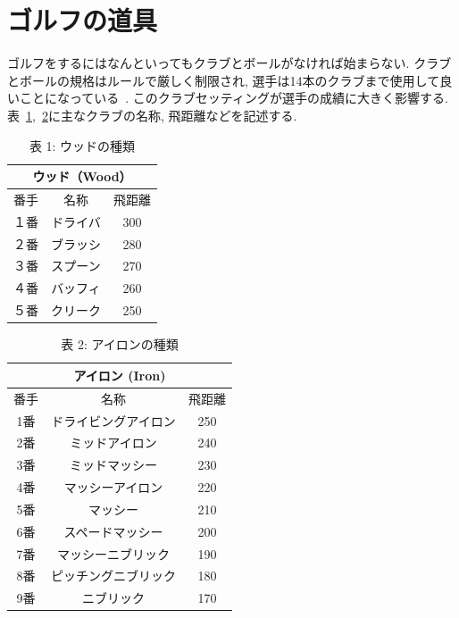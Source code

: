 \documentclass[a4j, twocolumn]{jarticle}
\begin{document}
\section{ゴルフの道具}
ゴルフをするにはなんといってもクラブとボールがなければ始まらない. クラブとボールの規格はルールで厳しく制限され, 選手は14本のクラブまで使用して良いことになっている~\cite{GOLFRULE}. このクラブセッティングが選手の成績に大きく影響する. 表~\ref{wood-data},~\ref{iron-data}に主なクラブの名称, 飛距離などを記述する.
\begin{table}[htb]
  \caption{表 1: ウッドの種類}\label{wood-data}
  \begin{center}
    \begin{tabular}{|c|c|c|}
      \hline
      \multicolumn{3}{|c|}{ウッド（Wood）} \\
      \hline
      \hline
      番手 & 名称 & 飛距離 \\
      \hline
      １番 & ドライバ & 300 \\
      \hline
      ２番 & ブラッシ & 280 \\
      \hline
      ３番 & スプーン & 270 \\
      \hline
      ４番 & バッフィ & 260\\
      \hline 
      ５番 & クリーク & 250 \\
      \hline
      
    \end{tabular}
  \end{center}
\end{table}
\vspace{-3em}
\begin{table}[htb]
  \caption{表 2: アイロンの種類}\label{iron-data}
  \begin{center}
    \begin{tabular}{|c|c|c|}
      \hline
      \multicolumn{3}{|c|}{アイロン (Iron)} \\
      \hline
      \hline
      番手 & 名称 & 飛距離 \\
      \hline
      1番 & ドライビングアイロン & 250 \\
      \hline
      2番 & ミッドアイロン & 240 \\
      \hline
      3番 & ミッドマッシー & 230 \\
      \hline
      4番 & マッシーアイロン & 220\\
      \hline 
      5番 & マッシー & 210 \\
      \hline
      6番 & スペードマッシー & 200 \\
      \hline
      7番 & マッシーニブリック & 190\\
      \hline 
      8番 & ピッチングニブリック & 180 \\
      \hline
      9番 & ニブリック & 170 \\
      \hline
    \end{tabular}
  \end{center}
\end{table}
\vspace{-2em}
\end{document}
